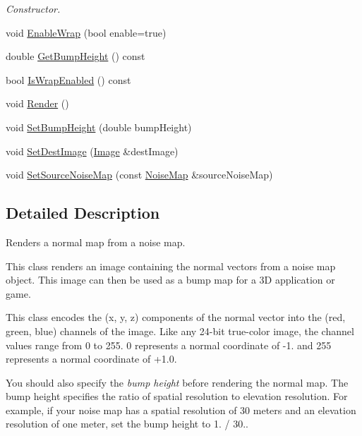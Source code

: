 \begin{DoxyCompactItemize}
\begin{DoxyCompactList}\small\item\em Constructor. \end{DoxyCompactList}\item 
void \hyperlink{classnoise_1_1utils_1_1_renderer_normal_map_a3a998d79c28c5a302e71f3f9e512019e}{Enable\+Wrap} (bool enable=true)
\item 
double \hyperlink{classnoise_1_1utils_1_1_renderer_normal_map_a7934a97f130810598618d9a4fb75e4d8}{Get\+Bump\+Height} () const 
\item 
bool \hyperlink{classnoise_1_1utils_1_1_renderer_normal_map_a4b3ad9693bfab047e34a015139b9ccdc}{Is\+Wrap\+Enabled} () const 
\item 
void \hyperlink{classnoise_1_1utils_1_1_renderer_normal_map_ad5296d8827ea9f309f734914bc40c05c}{Render} ()
\item 
void \hyperlink{classnoise_1_1utils_1_1_renderer_normal_map_acd9108556c634f1f7ed7a29978861cf8}{Set\+Bump\+Height} (double bump\+Height)
\item 
void \hyperlink{classnoise_1_1utils_1_1_renderer_normal_map_ae897dedd021446330d2b2ea619008acc}{Set\+Dest\+Image} (\hyperlink{classnoise_1_1utils_1_1_image}{Image} \&dest\+Image)
\item 
void \hyperlink{classnoise_1_1utils_1_1_renderer_normal_map_a89c35a7cd1b307da714c7389d56c57db}{Set\+Source\+Noise\+Map} (const \hyperlink{classnoise_1_1utils_1_1_noise_map}{Noise\+Map} \&source\+Noise\+Map)
\end{DoxyCompactItemize}


\subsection{Detailed Description}
Renders a normal map from a noise map.

This class renders an image containing the normal vectors from a noise map object. This image can then be used as a bump map for a 3\+D application or game.

This class encodes the (x, y, z) components of the normal vector into the (red, green, blue) channels of the image. Like any 24-\/bit true-\/color image, the channel values range from 0 to 255. 0 represents a normal coordinate of -\/1. and 255 represents a normal coordinate of +1.0.

You should also specify the {\itshape bump height} before rendering the normal map. The bump height specifies the ratio of spatial resolution to elevation resolution. For example, if your noise map has a spatial resolution of 30 meters and an elevation resolution of one meter, set the bump height to 1. / 30..

